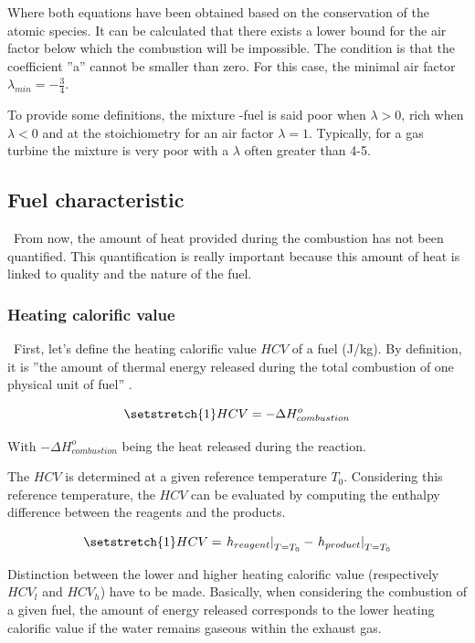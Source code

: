 Where both equations have been obtained based on the conservation of the atomic species. It can be calculated that there exists a lower bound for the air factor below which the combustion will be impossible. The condition is that the coefficient ''a'' cannot be smaller than zero. For this case, the minimal air factor \(\lambda_{min} =-\frac{3}{4}\).

To provide some definitions, the mixture -fuel is said poor when \(\lambda>0\), rich when \(\lambda<0\) and at the stoichiometry for an air factor \(\lambda=1\). Typically, for a gas turbine the mixture is very poor with a $\lambda$ often greater than 4-5.

\subsection{Fuel characteristic}
\quad\ From now, the amount of heat provided during the combustion has not been quantified. This quantification is really important because this amount of heat is linked to quality and the nature of the fuel.

\subsubsection{Heating calorific value}
\quad\ First, let's define the heating calorific value \(HCV\) of a fuel (J/kg). By definition, it is ''the amount of thermal energy released during the total combustion of one physical unit of fuel” \cite{Leonard2018}.

\begin{equation}
    \setstretch{1}
    HCV = -\Delta H^o_{combustion} \label{eq:C4_HCV1}
\end{equation}

With \(-\Delta H^o_{combustion}\) being the heat released during the reaction.

The \(HCV\) is determined at a given reference temperature \(T_0\). Considering this reference temperature, the \(HCV\) can be evaluated by computing the enthalpy difference between the reagents and the products.

\begin{equation}
    \setstretch{1}
    HCV = \left.h_{reagent}\right|_{T=T_0} - \left.h_{product}\right|_{T=T_0}\label{eq:C4_HCV2}
\end{equation}

Distinction between the lower and higher heating calorific value (respectively $HCV_l$ and $HCV_h$) have to be made. Basically, when considering the combustion of a given fuel, the amount of energy released corresponds to the lower heating calorific value if the water remains gaseous within the exhaust gas. 

